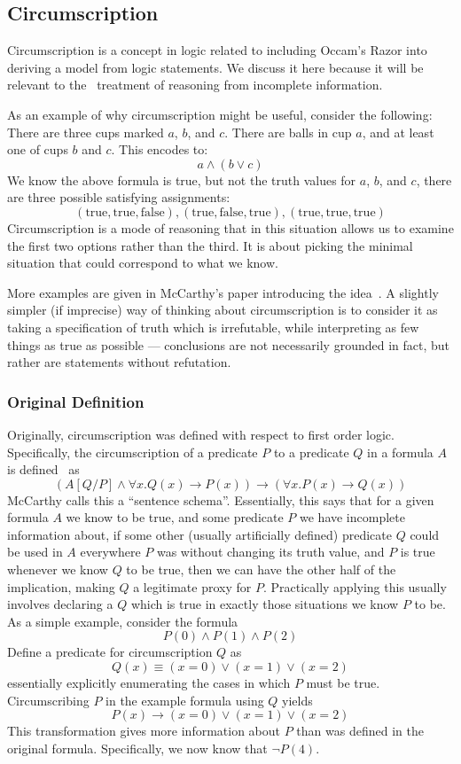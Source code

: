 \subsection{Circumscription}
\label{sec:circumscription}
Circumscription is a concept in logic related to including Occam's Razor into deriving a model from logic statements.
We discuss it here because it will be relevant to the \sysname\ treatment of reasoning from incomplete information.

\newcommand{\true}{\textrm{true}}
\newcommand{\false}{\textrm{false}}
As an example of why circumscription might be useful, consider the following:
There are three cups marked $a$, $b$, and $c$.
There are balls in cup $a$, and at least one of cups $b$ and $c$.
This encodes to:
\[a \wedge (b \vee c)\]
We know the above formula is true, but not the truth values for $a$, $b$, and $c$, there are three possible satisfying assignments:
\[
        (\true, \true, \false), (\true, \false, \true), (\true, \true, \true)
\]
Circumscription is a mode of reasoning that in this situation allows us to examine the first two options rather than the third.
It is about picking the minimal situation that could correspond to what we know.

More examples are given in McCarthy's paper introducing the idea~\cite{circumscription}.
A slightly simpler (if imprecise) way of thinking about circumscription is to consider it as taking a specification of truth which is irrefutable, while interpreting as few things as true as possible --- conclusions are not necessarily grounded in fact, but rather are statements without refutation.
\subsubsection{Original Definition}
Originally, circumscription was defined with respect to first order logic.
Specifically, the circumscription of a predicate $P$ to a predicate $Q$ in a formula $A$ is defined~\cite{circumscription} as
\[
(A [Q/P] \wedge \forall x. Q(x) \rightarrow P(x)) \rightarrow (\forall x. P(x) \rightarrow Q(x))
\]
McCarthy calls this a ``sentence schema''.
Essentially, this says that for a given formula $A$ we know to be true, and some predicate $P$ we have incomplete information about, if some other (usually artificially defined) predicate $Q$ could be used in $A$ everywhere $P$ was without changing its truth value, and $P$ is true whenever we know $Q$ to be true, then we can have the other half of the implication, making $Q$ a legitimate proxy for $P$.
Practically applying this usually involves declaring a $Q$ which is true in exactly those situations we know $P$ to be.
As a simple example, consider the formula
\[
        P(0) \wedge P(1) \wedge P(2)
\]
Define a predicate for circumscription $Q$ as
\[
        Q(x) \equiv (x = 0) \vee (x = 1) \vee (x = 2)
\]
essentially explicitly enumerating the cases in which $P$ must be true.
Circumscribing $P$ in the example formula using $Q$ yields
\[
        P(x) \rightarrow (x = 0) \vee (x = 1) \vee (x = 2)
\]
This transformation gives more information about $P$ than was defined in the original formula.
Specifically, we now know that $\neg P(4)$.

